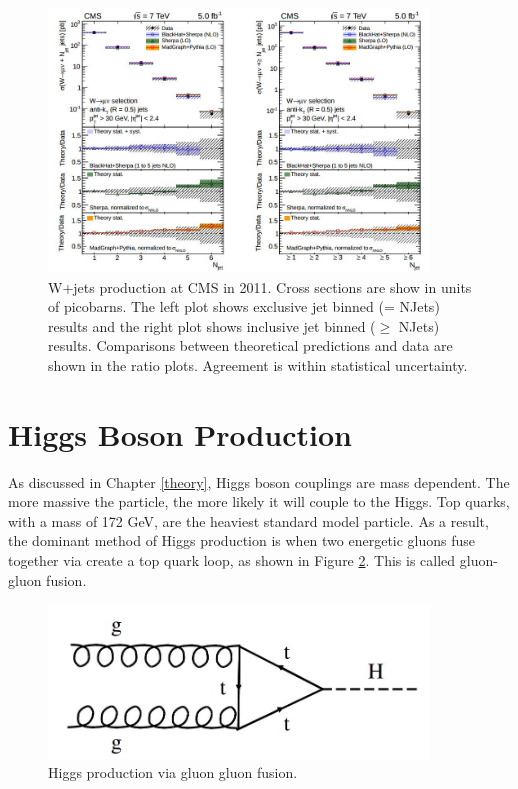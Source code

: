 \documentclass[oneside, letterpaper, oldfontcommands]{memoir}
\begin{document}
\begin{figure}[here]
\includegraphics[width=0.9\textwidth]{wjets7TeV.jpg}
\caption{W+jets production at CMS in 2011. Cross sections are show in units of picobarns. The left plot shows exclusive jet binned (= NJets) results and the right plot shows inclusive jet binned ($\geq$ NJets) results. Comparisons between theoretical predictions and data are shown in the ratio plots. Agreement is within statistical uncertainty. }
\label{fig:wjets7TeV}
\end{figure}


\section{Higgs Boson Production}\label{higgspheno}
\qquad As discussed in Chapter \ref{theory}, Higgs boson couplings are mass dependent. The more massive the particle, the more likely it will couple to the Higgs. Top quarks, with a mass of 172 GeV, are the heaviest standard model particle. As a result, the dominant method of Higgs production is when two energetic gluons fuse together via create a top quark loop, as shown in Figure \ref{fig:ggfHiggs}. This is called gluon-gluon fusion.

\begin{figure}[here]
\includegraphics[width=0.9\textwidth]{ggfHiggs.jpg}
\caption{Higgs production via gluon gluon fusion.}
\label{fig:ggfHiggs}
\end{figure}
\end{document}
